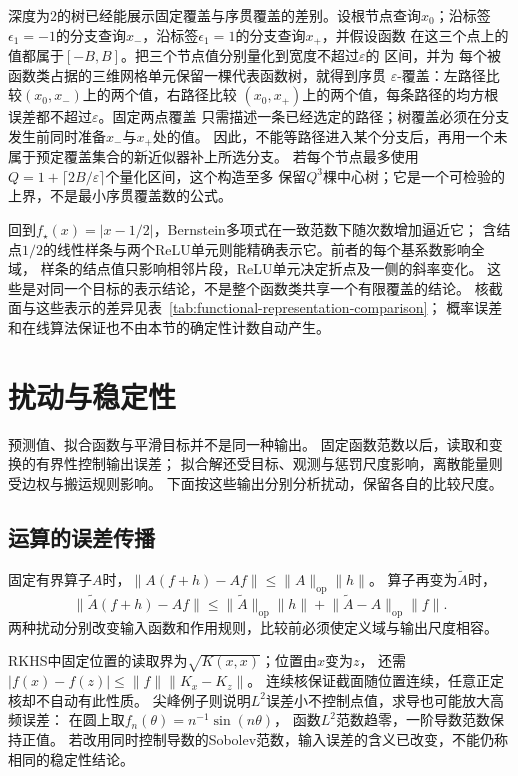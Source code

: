 深度为$2$的树已经能展示固定覆盖与序贯覆盖的差别。设根节点查询$x_0$；沿标签
$\epsilon_1=-1$的分支查询$x_-$，沿标签$\epsilon_1=1$的分支查询$x_+$，并假设函数
在这三个点上的值都属于$[-B,B]$。把三个节点值分别量化到宽度不超过$\varepsilon$的
区间，并为
每个被函数类占据的三维网格单元保留一棵代表函数树，就得到序贯
$\varepsilon$-覆盖：左路径比较$(x_0,x_-)$上的两个值，右路径比较
$(x_0,x_+)$上的两个值，每条路径的均方根误差都不超过$\varepsilon$。固定两点覆盖
只需描述一条已经选定的路径；树覆盖必须在分支发生前同时准备$x_-$与$x_+$处的值。
因此，不能等路径进入某个分支后，再用一个未属于预定覆盖集合的新近似器补上所选分支。
若每个节点最多使用$Q=1+\lceil2B/\varepsilon\rceil$个量化区间，这个构造至多
保留$Q^3$棵中心树；它是一个可检验的上界，不是最小序贯覆盖数的公式。

回到$f_\star(x)=|x-1/2|$，Bernstein多项式在一致范数下随次数增加逼近它；
含结点$1/2$的线性样条与两个ReLU单元则能精确表示它。前者的每个基系数影响全域，
样条的结点值只影响相邻片段，ReLU单元决定折点及一侧的斜率变化。
这些是对同一个目标的表示结论，不是整个函数类共享一个有限覆盖的结论。
核截面与这些表示的差异见表~\ref{tab:functional-representation-comparison}；
概率误差和在线算法保证也不由本节的确定性计数自动产生。

\section{扰动与稳定性}
\label{sec:functional-stability}

预测值、拟合函数与平滑目标并不是同一种输出。
固定函数范数以后，读取和变换的有界性控制输出误差；
拟合解还受目标、观测与惩罚尺度影响，离散能量则受边权与搬运规则影响。
下面按这些输出分别分析扰动，保留各自的比较尺度。

\subsection{运算的误差传播}
\label{sec:functional-operation-stability}

固定有界算子$A$时，$\lVert A(f+h)-Af\rVert\leq\lVert A\rVert_{\mathrm{op}}\lVert h\rVert$。
算子再变为$\widetilde A$时，
\[
 \lVert\widetilde A(f+h)-Af\rVert
 \leq\lVert\widetilde A\rVert_{\mathrm{op}}\lVert h\rVert
       +\lVert\widetilde A-A\rVert_{\mathrm{op}}\lVert f\rVert.
\]
两种扰动分别改变输入函数和作用规则，比较前必须使定义域与输出尺度相容。

RKHS中固定位置的读取界为$\sqrt{K(x,x)}$；位置由$x$变为$z$，
还需$|f(x)-f(z)|\leq\lVert f\rVert\lVert K_x-K_z\rVert$。
连续核保证截面随位置连续，任意正定核却不自动有此性质。
尖峰例子则说明$L^2$误差小不控制点值，求导也可能放大高频误差：
在圆上取$f_n(\theta)=n^{-1}\sin(n\theta)$，
函数$L^2$范数趋零，一阶导数范数保持正值。
若改用同时控制导数的Sobolev范数，输入误差的含义已改变，不能仍称相同的稳定性结论。


